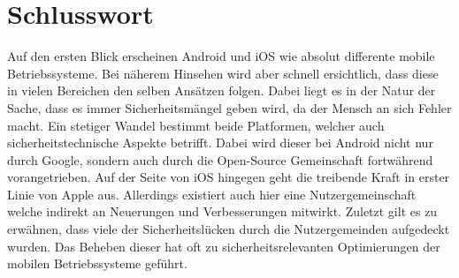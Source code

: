 \section{Schlusswort}
	Auf den ersten Blick erscheinen Android und iOS wie absolut differente mobile
	Betriebssysteme. Bei näherem Hinsehen wird aber schnell ersichtlich, dass diese
	in vielen Bereichen den selben Ansätzen folgen. Dabei liegt es in der Natur der
	Sache, dass es immer Sicherheitsmängel geben wird, da der Mensch an sich Fehler macht. 
	Ein stetiger Wandel bestimmt beide Platformen, welcher auch
	sicherheitstechnische Aspekte betrifft. Dabei wird dieser bei Android nicht nur
	durch Google, sondern auch durch die Open-Source Gemeinschaft fortwährend
	vorangetrieben. Auf der Seite von iOS hingegen geht die treibende Kraft in
	erster Linie von Apple aus. Allerdings existiert auch hier eine
	Nutzergemeinschaft welche indirekt an Neuerungen und Verbesserungen mitwirkt.
	Zuletzt gilt es zu erwähnen, dass viele der Sicherheitslücken durch die
	Nutzergemeinden aufgedeckt wurden. Das Beheben dieser hat oft zu
	sicherheitsrelevanten Optimierungen der mobilen Betriebssysteme geführt.